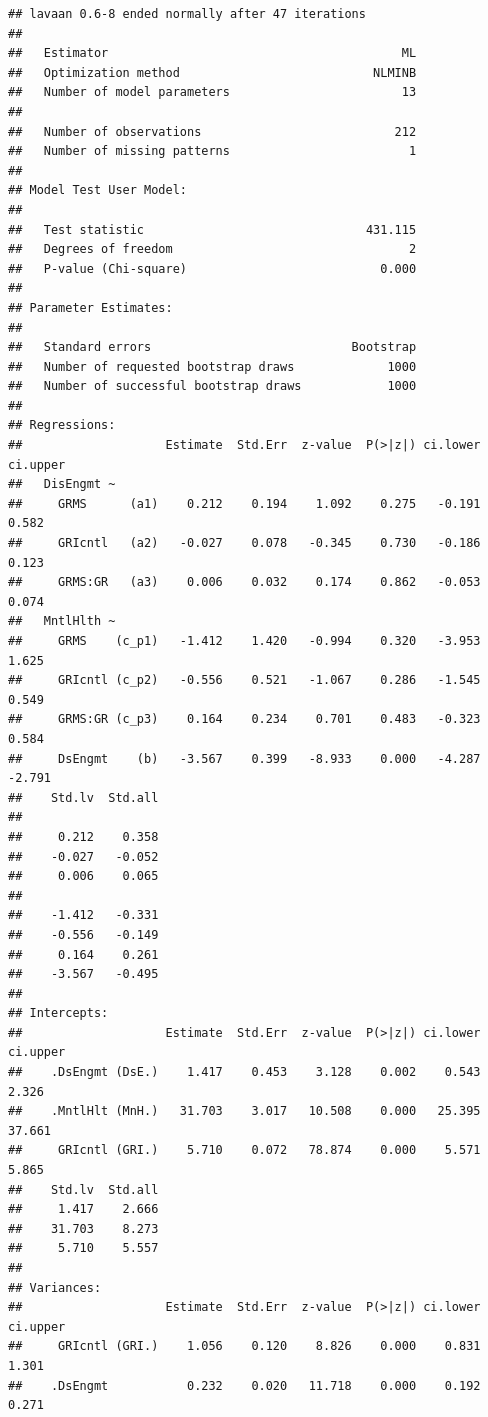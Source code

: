 \documentclass[
  english,
]{book}
\begin{document}
\begin{verbatim}
## lavaan 0.6-8 ended normally after 47 iterations
## 
##   Estimator                                         ML
##   Optimization method                           NLMINB
##   Number of model parameters                        13
##                                                       
##   Number of observations                           212
##   Number of missing patterns                         1
##                                                       
## Model Test User Model:
##                                                       
##   Test statistic                               431.115
##   Degrees of freedom                                 2
##   P-value (Chi-square)                           0.000
## 
## Parameter Estimates:
## 
##   Standard errors                            Bootstrap
##   Number of requested bootstrap draws             1000
##   Number of successful bootstrap draws            1000
## 
## Regressions:
##                    Estimate  Std.Err  z-value  P(>|z|) ci.lower ci.upper
##   DisEngmt ~                                                            
##     GRMS      (a1)    0.212    0.194    1.092    0.275   -0.191    0.582
##     GRIcntl   (a2)   -0.027    0.078   -0.345    0.730   -0.186    0.123
##     GRMS:GR   (a3)    0.006    0.032    0.174    0.862   -0.053    0.074
##   MntlHlth ~                                                            
##     GRMS    (c_p1)   -1.412    1.420   -0.994    0.320   -3.953    1.625
##     GRIcntl (c_p2)   -0.556    0.521   -1.067    0.286   -1.545    0.549
##     GRMS:GR (c_p3)    0.164    0.234    0.701    0.483   -0.323    0.584
##     DsEngmt    (b)   -3.567    0.399   -8.933    0.000   -4.287   -2.791
##    Std.lv  Std.all
##                   
##     0.212    0.358
##    -0.027   -0.052
##     0.006    0.065
##                   
##    -1.412   -0.331
##    -0.556   -0.149
##     0.164    0.261
##    -3.567   -0.495
## 
## Intercepts:
##                    Estimate  Std.Err  z-value  P(>|z|) ci.lower ci.upper
##    .DsEngmt (DsE.)    1.417    0.453    3.128    0.002    0.543    2.326
##    .MntlHlt (MnH.)   31.703    3.017   10.508    0.000   25.395   37.661
##     GRIcntl (GRI.)    5.710    0.072   78.874    0.000    5.571    5.865
##    Std.lv  Std.all
##     1.417    2.666
##    31.703    8.273
##     5.710    5.557
## 
## Variances:
##                    Estimate  Std.Err  z-value  P(>|z|) ci.lower ci.upper
##     GRIcntl (GRI.)    1.056    0.120    8.826    0.000    0.831    1.301
##    .DsEngmt           0.232    0.020   11.718    0.000    0.192    0.271

\end{verbatim}
\end{document}
